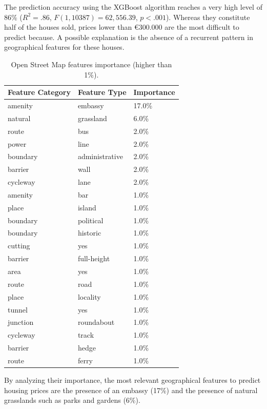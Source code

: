\documentclass[]{elsarticle} %
\begin{document}
The prediction accuracy using the XGBoost algorithm reaches a very high
level of 86\% (\(R^2 = .86\), \(F(1, 10387) = 62,556.39\),
\(p < .001\)). Whereas they constitute half of the houses sold, prices
lower than €300.000 are the most difficult to predict because. A
possible explanation is the absence of a recurrent pattern in
geographical features for these houses.

\begin{table}[!h]

\caption{\label{tab:OSM-features-table}Open Street Map features importance (higher than 1\%).}
\centering
\fontsize{8}{10}\selectfont
\begin{tabular}{>{\raggedright\arraybackslash}p{1in}>{\raggedright\arraybackslash}p{3in}l}
\toprule
Feature Category & Feature Type & Importance\\
\midrule
amenity & embassy & 17.0\%\\
natural & grassland & 6.0\%\\
route & bus & 2.0\%\\
power & line & 2.0\%\\
boundary & administrative & 2.0\%\\
barrier & wall & 2.0\%\\
cycleway & lane & 2.0\%\\
amenity & bar & 1.0\%\\
place & island & 1.0\%\\
boundary & political & 1.0\%\\
boundary & historic & 1.0\%\\
cutting & yes & 1.0\%\\
barrier & full-height & 1.0\%\\
area & yes & 1.0\%\\
route & road & 1.0\%\\
place & locality & 1.0\%\\
tunnel & yes & 1.0\%\\
junction & roundabout & 1.0\%\\
cycleway & track & 1.0\%\\
barrier & hedge & 1.0\%\\
route & ferry & 1.0\%\\
\bottomrule
\end{tabular}
\end{table}

By analyzing their importance, the most relevant geographical features
to predict housing prices are the presence of an embassy (17\%) and the
presence of natural grasslands such as parks and gardens (6\%).
\end{document}
